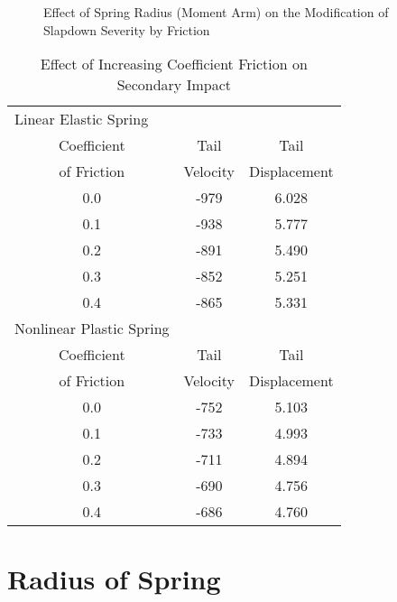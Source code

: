 \begin{figure}
\vspace{3.5 in}
\caption{Effect of Spring Radius (Moment Arm) on the Modification of
Slapdown Severity by Friction}
\end{figure}

\begin{table}
\begin{center}
\caption{Effect of Increasing Coefficient Friction on Secondary 
Impact}
\begin{tabular}{||c|c|c||}
\hline
\multicolumn{1}{||l|}{Linear Elastic Spring} & &\\
     Coefficient            &Tail                  &Tail\\
     of Friction          &Velocity            &Displacement\\
         0.0               &-979                   &6.028\\
         0.1               &-938                   &5.777\\
         0.2               &-891                   &5.490\\
         0.3               &-852                   &5.251\\
         0.4               &-865                   &5.331\\
\hline
\multicolumn{1}{||l|}{Nonlinear Plastic Spring} & & \\
     Coefficient            &Tail                  &Tail\\
     of Friction          &Velocity            &Displacement\\
         0.0               &-752                   &5.103\\
         0.1               &-733                   &4.993\\
         0.2               &-711                   &4.894\\
         0.3               &-690                   &4.756\\
         0.4               &-686                   &4.760\\
\hline
\end{tabular}
\end{center}
\end{table}

\section{Radius of Spring}

